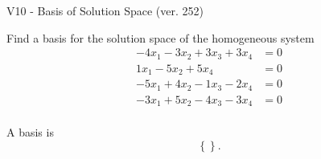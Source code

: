 \begin{exercise}
  \begin{exerciseTitle}V10 - Basis of Solution Space (ver. 252)\end{exerciseTitle}
  \begin{exerciseStatement}
    Find a basis for the solution space of the homogeneous system 
\begin{align*}
 -4 x_ 1 -3 x_ 2 + 3 x_ 3 + 3 x_ 4 &= 0  \\ 
  1 x_ 1 -5 x_ 2 + 5 x_ 4 &= 0  \\ 
  -5 x_ 1 + 4 x_ 2 -1 x_ 3 -2 x_ 4 &= 0  \\ 
  -3 x_ 1 + 5 x_ 2 -4 x_ 3 -3 x_ 4 &= 0  \\ 
 \end{align*}


 
  \end{exerciseStatement}

  \begin{exerciseAnswer}
   A basis is   
\[\left\{\right\}.\]

  


  \end{exerciseAnswer}
\end{exercise}